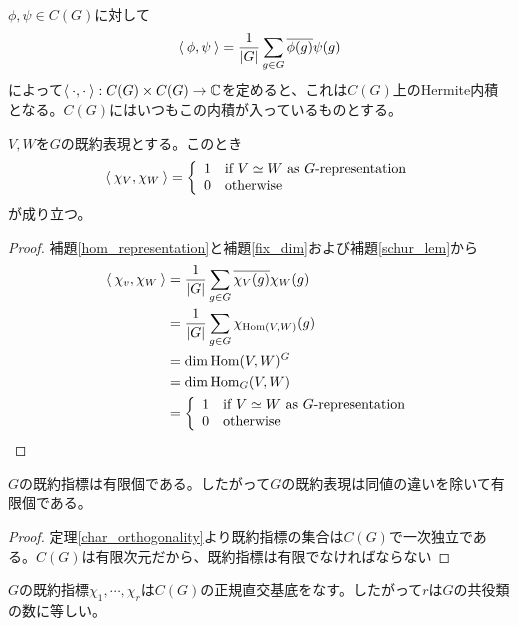 \documentclass{ltjsarticle}
\begin{document}
\begin{defin}
  $\phi,\psi\in C(G)$に対して
  \[
  \langle\:\phi,\psi\:\rangle=\frac{1}{|G|}\sum_{g\in G}\overline{\phi(g)}\psi(g)  
  \]
  によって$\langle\:\cdot,\cdot\:\rangle:C(G)\times C(G)\rightarrow \mathbb{C}$を定めると、これは$C(G)$上のHermite内積となる。$C(G)$にはいつもこの内積が入っているものとする。
\end{defin}

\begin{theo}[指標の直交関係]\label{char_orthogonality}
  $V,W$を$G$の既約表現とする。このとき
  \[
  \langle\:\chi_V,\chi_W\:\rangle=\left\{\begin{array}{cl}
    1 & \text{if $V\simeq W$ as $G$-representation}\\
    0 & \text{otherwise}
  \end{array}\right.  
  \]
  が成り立つ。
\end{theo}

\begin{proof}
  補題\ref{hom_representation}と補題\ref{fix_dim}および補題\ref{schur_lem}から
  \begin{align*}
    \langle\:\chi_v,\chi_W\:\rangle&=\frac{1}{|G|}\sum_{g\in G}\overline{\chi_V(g)}\chi_W(g)\\
    &=\frac{1}{|G|}\sum_{g\in G}\chi_{\text{Hom}(V,W)}(g)\\
    &=\dim \text{Hom}(V,W)^G\\
    &=\dim \text{Hom}_G(V,W)\\
    &=\left\{\begin{array}{cl}
      1 & \text{if $V\simeq W$ as $G$-representation}\\
      0 & \text{otherwise}
    \end{array}\right.  
  \end{align*}
\end{proof}


\begin{cor}
  $G$の既約指標は有限個である。したがって$G$の既約表現は同値の違いを除いて有限個である。
\end{cor}

\begin{proof}
  定理\ref{char_orthogonality}より既約指標の集合は$C(G)$で一次独立である。$C(G)$は有限次元だから、既約指標は有限でなければならない
\end{proof}

\begin{cor}\label{irr_char_is_basis}
  $G$の既約指標$\chi_1,\cdots,\chi_r$は$C(G)$の正規直交基底をなす。したがって$r$は$G$の共役類の数に等しい。
\end{cor}
\end{document}
